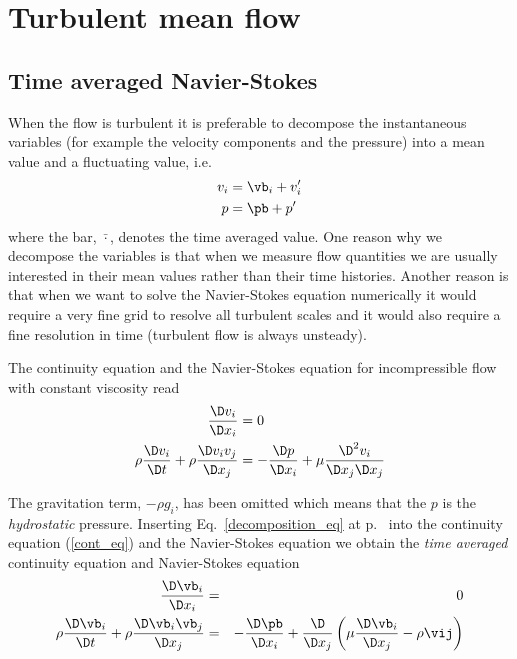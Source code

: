 \section{Turbulent mean flow}

\subsection{Time averaged Navier-Stokes}

When the flow is turbulent it is preferable to decompose
the instantaneous variables (for example the velocity components and
the pressure) into a mean value and a fluctuating value, i.e.
%
\begin{equation}
\label{decomposition_eq}
\begin{split}
v_i &= \vb_i + v'_i \\
p &= \pb + p'
\end{split}
\end{equation}
%
where the bar, $\bar{\cdot}$, denotes the time averaged value.
One reason why we decompose the variables is that
when we measure flow quantities we are usually interested
in their mean values rather than their time histories.
Another reason is that when we want to solve the Navier-Stokes
equation
numerically it would require a very fine grid to resolve all turbulent
scales and it would also require a fine resolution in time (turbulent
flow is always unsteady). 

The continuity equation and the Navier-Stokes equation for  incompressible flow  with constant
viscosity read
%
\begin{equation}
\label{cont_eq}
\begin{split}
\frac{\D v_i}{\D x_i} &= 0\\
\rho \frac{\D v_{i}}{\D t} + \rho \frac{\D v_i v_j}{\D x_j} &=
- \frac{\D p}{\D x_i} + \mu \frac{\D^2 v_i}{\D x_j\D x_j}
\end{split}
\end{equation}
%

The gravitation term, $-\rho g_i$, has been omitted which means that the $p$ is the \emph{hydrostatic}
pressure.
Inserting Eq.~\ref{decomposition_eq} at p.~\pageref{decomposition_eq} into the continuity equation
(\ref{cont_eq}) and the Navier-Stokes equation we obtain
the \emph{time averaged} continuity equation and Navier-Stokes
equation
%
\begin{eqnarray}
\label{cont_time_eq}
\frac{\D  \vb_i}{\D x_i} &=& 0\\
\label{NS_time_eq}
\rho \frac{\D \vb_{i}}{\D t} + \rho \frac{\D \vb_i \vb_j}{\D x_j} &=&
- \frac{\D \pb}{\D x_i} + \frac{\D}{\D x_j}\left(\mu \frac{\D \vb_i}{\D x_j} - \rho \vij \right)
\end{eqnarray}

